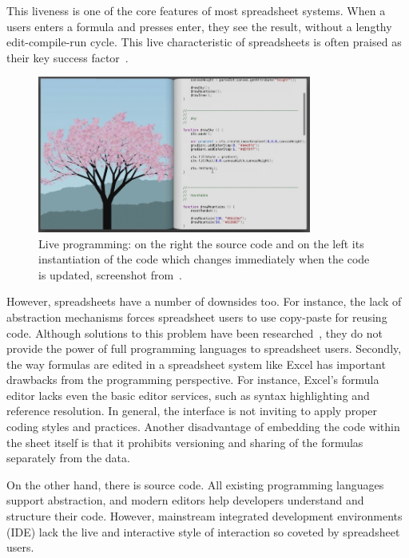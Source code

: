 \documentclass{llncs}
\newcommand{\todo}[1]{\textbf{#1}}
\begin{document}
This liveness is one of the core features of most spreadsheet systems. When a users enters a formula and presses enter, they see the result, without a lengthy edit-compile-run cycle. This live characteristic of spreadsheets is often praised as their key success factor~\cite{HermansPhD}.
\begin{figure}
  \begin{center}
  \includegraphics[width=9cm]{fig/bret.png}
  \caption{Live programming: on the right the source code and on the left its instantiation of the code which changes immediately when the code is updated, screenshot from~\cite{Victor2012}.}
  \label{fig:bret}
  \end{center}
\end{figure} 
However, spreadsheets have a number of downsides too. For instance, the lack of  abstraction mechanisms forces spreadsheet users to use copy-paste for reusing code. Although solutions to this problem have been researched~\cite{hermans_2015_19341,jones2003user}, they do not provide the power of full programming languages to spreadsheet users. Secondly, the way formulas are edited in a spreadsheet system like Excel has important drawbacks from the programming perspective. For instance, Excel's formula editor lacks even the basic editor services, such as  syntax highlighting and reference resolution.  In general, the interface is not inviting to apply proper coding styles and practices. Another disadvantage of embedding the code within the sheet itself is that it prohibits versioning and sharing of the formulas separately from the data. 

On the other hand, there is source code. All existing programming languages support abstraction, and modern editors help developers understand and structure their code. However, mainstream integrated development environments (IDE) lack the live and interactive style of interaction so coveted by spreadsheet users.
\end{document}
